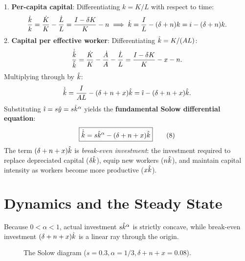 \documentclass[11pt]{article}
\begin{document}
1. \textbf{Per-capita capital}: Differentiating $k = K / L$ with respect to time:
\[
\frac{\dot{k}}{k} = \frac{\dot{K}}{K} - \frac{\dot{L}}{L} = \frac{I - \delta K}{K} - n \implies \dot{k} = \frac{I}{L} - (\delta + n)k = i - (\delta + n)k.
\]
2. \textbf{Capital per effective worker}: Differentiating $\hat{k} = K / (AL)$:
\[
\frac{\dot{\hat{k}}}{\hat{k}} = \frac{\dot{K}}{K} - \frac{\dot{A}}{A} - \frac{\dot{L}}{L} = \frac{I - \delta K}{K} - x - n.
\]
Multiplying through by $\hat{k}$:
\[
\dot{\hat{k}} = \frac{I}{AL} - (\delta + n + x)\hat{k} = \hat{\imath} - (\delta+n+x)\hat{k}.
\]
Substituting $\hat{\imath} = s\hat{y} = s\hat{k}^\alpha$ yields the \textbf{fundamental Solow differential equation}:
\[
\boxed{\dot{\hat{k}} = s\hat{k}^\alpha - (\delta+n+x)\hat{k}} \tag{8}
\]
The term $(\delta+n+x)\hat{k}$ is \emph{break-even investment}: the investment required to replace depreciated capital ($\delta\hat{k}$), equip new workers ($n\hat{k}$), and maintain capital intensity as workers become more productive ($x\hat{k}$).

\section{Dynamics and the Steady State}

Because $0 < \alpha < 1$, actual investment $s\hat{k}^\alpha$ is strictly concave, while break-even investment $(\delta+n+x)\hat{k}$ is a linear ray through the origin.

\begin{figure}[ht]
\centering
{}
\caption{The Solow diagram ($s=0.3, \alpha=1/3, \delta+n+x=0.08$).}
\end{figure}
\end{document}

